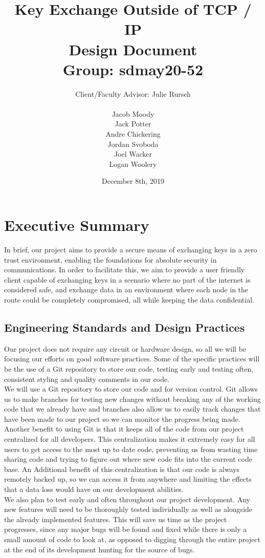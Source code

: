 \documentclass[11pt]{article}
\title{\textbf{Key Exchange Outside of TCP / IP}\\ 
{\normalsize Design Document} \\
{\normalsize Group: sdmay20-52}}
\author{Client/Faculty Advisor: Julie Rursch\\
\\
		Jacob Moody\\
		Jack Potter\\
		Andre Chickering\\
		Jordan Svoboda\\
		Joel Wacker\\
		Logan Woolery
}
\date{December 8th, 2019}
\begin{document}
\maketitle
\newpage
\section*{Executive Summary}

In brief, our project aims to provide a secure means of exchanging keys in a zero trust environment, enabling the foundations for absolute security in communications. In order to facilitate this, we aim to provide a user friendly client capable of exchanging keys in a scenario where no part of the internet is considered safe, and exchange data in an environment where each node in the route could be completely compromised, all while keeping the data confidential.

\subsection*{Engineering Standards and Design Practices}
Our project does not require any circuit or hardware design, so all we will be focusing our efforts on good software practices. Some of the specific practices will be the use of a Git repository to store our code, testing early and testing often, consistent styling and quality comments in our code. \\

We will use a Git repository to store our code and for version control. Git allows us to make branches for testing new changes without breaking any of the working code that we already have and branches also allow us to easily track changes that have been made to our project so we can monitor the progress being made. Another benefit to using Git is that it keeps all of the code from our project centralized for all developers. This centralization makes it extremely easy for all users to get access to the most up to date code, preventing us from wasting time sharing code and trying to figure out where new code fits into the current code base. An Additional benefit of this centralization is that our code is always remotely backed up, so we can access it from anywhere and limiting the effects that a data loss would have on our development abilities. \\

We also plan to test early and often throughout our project development. Any new features will need to be thoroughly tested individually as well as alongside the already implemented features. This will save us time as the project progresses, since any major bugs will be found and fixed while there is only a small amount of code to look at, as opposed to digging through the entire project at the end of its development hunting for the source of bugs. \\
\end{document}
